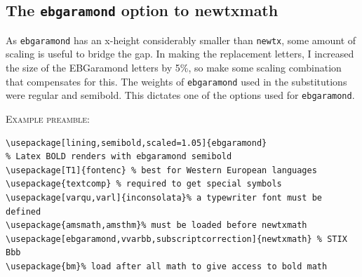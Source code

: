 \documentclass[11pt]{article}
\theoremstyle{oldplain}
\theoremstyle{plain}
\begin{document}
\subsection*{The {\tt ebgaramond} option to newtxmath}
As {\tt ebgaramond} has an x-height considerably smaller than {\tt newtx}, some amount of scaling is useful to bridge the gap. In making the replacement letters, I increased the size of the EBGaramond letters by 5\%, so make some scaling combination that compensates for this. The weights of {\tt ebgaramond} used in the substitutions were regular and semibold. This dictates one of the options used for {\tt ebgaramond}.

\textsc{Example preamble:}\\
\begin{verbatim}
\usepackage[lining,semibold,scaled=1.05]{ebgaramond} 
% Latex BOLD renders with ebgaramond semibold 
\usepackage[T1]{fontenc} % best for Western European languages
\usepackage{textcomp} % required to get special symbols
\usepackage[varqu,varl]{inconsolata}% a typewriter font must be defined
\usepackage{amsmath,amsthm}% must be loaded before newtxmath
\usepackage[ebgaramond,vvarbb,subscriptcorrection]{newtxmath} % STIX Bbb
\usepackage{bm}% load after all math to give access to bold math
\end{verbatim}
\end{document}
